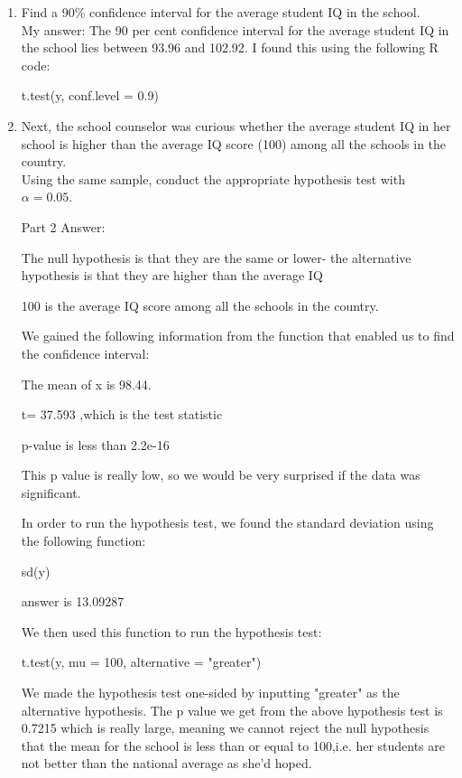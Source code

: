 \documentclass[12pt,letterpaper]{article}
\begin{document}
\begin{enumerate}
	\item Find a 90\% confidence interval for the average student IQ in the school.\\
	
My answer: The 90 per cent confidence interval for the average student IQ in the school lies between 93.96 and 102.92.
I found this using the following R code:

t.test(y, conf.level = 0.9)

	
	\item Next, the school counselor was curious  whether  the average student IQ in her school is higher than the average IQ score (100) among all the schools in the country.\\ 
	
	\noindent Using the same sample, conduct the appropriate hypothesis test with $\alpha=0.05$.
	
	Part 2 Answer: 
	
	The null hypothesis is that they are the same or lower- the alternative hypothesis is that they are higher than the average IQ 
	
	100 is the average IQ score among all the schools in the country.
	
	We gained the following information from the function that enabled us to find the confidence interval: 
	
	The mean of x is 98.44.
	
	t= 37.593 ,which is the test statistic
	
	p-value is less than 2.2e-16
	
	This p value is really low, so we would be very surprised if the data was significant.
	
	In order to run the hypothesis test, we found the standard deviation using the following function:
	
	sd(y)
	
	answer is 13.09287
	

	
	
We then used this function to run the hypothesis test:
	
	t.test(y, mu = 100, alternative = "greater")
	
	We made the hypothesis test one-sided by inputting "greater" as the alternative hypothesis.
	The p value we get from the above hypothesis test is 0.7215 which 
	is really large, meaning we cannot reject the null hypothesis that the mean for the school is less than or equal to 100,i.e. her students are not better than the national average as she'd hoped.
	
	
\end{enumerate}
\end{document}
